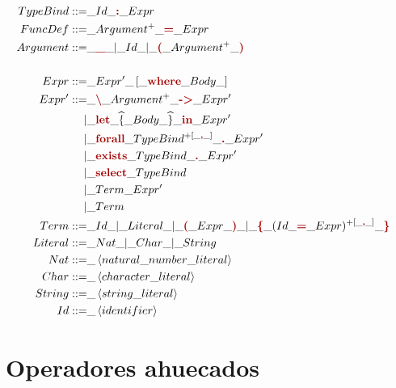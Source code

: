 {\begin{implementationfr}
{\begin{align*}
\\
\\
TypeBind ::=& \_ Id \_ \lt{:} \_ Expr
\\
FuncDef ::=& \_ \list{Argument} \_ \lt{=} \_ Expr
\\
Argument ::=
    & \_ \lt{\textunderscore} \_ | \_ Id \_ | \_ \parens{\list{Argument}}
\\
\\
Expr ::=& \_ Expr' \_ \maybe{\lt{where} \_ Body}
\\
Expr' ::=
     & \_ \lt{\textbackslash} \_ \list{Argument} \_ \lt{->} \_ Expr'
\\
    |& \_ \lt{let} \_ \scope{Body} \_ \lt{in} \_ Expr'
\\
    |& \_ \lt{forall} \_ \listSep{TypeBind}{\lt{,}} \_ \lt{.} \_ Expr'
\\
    |& \_ \lt{exists} \_ TypeBind \_ \lt{.} \_ Expr'
\\
    |& \_ \lt{select} \_ TypeBind
\\
    |& \_ Term \_ Expr'
\\
    |& \_ Term
\\
Term ::=
     & \_ Id \_ | \_ Literal \_ | \_ \parens{Expr} \_
     | \_ \lt{\{} \_ \listSep{(Id \_ \lt{=} \_ Expr)}{\lt{,}} \_ \lt{\}}
\\
Literal ::=& \_ Nat \_ | \_ Char \_ | \_ String
\\
Nat ::=& \_ \left<natural \_ number \_ literal\right>
\\
Char ::=& \_ \left<character \_ literal\right>
\\
String ::=& \_ \left<string \_ literal\right>
\\
Id ::=& \_ \left<identifier\right>
\end{align*}
\label{fig:parser-grammar}
}

\end{implementationfr}

\section{Operadores ahuecados}

}
